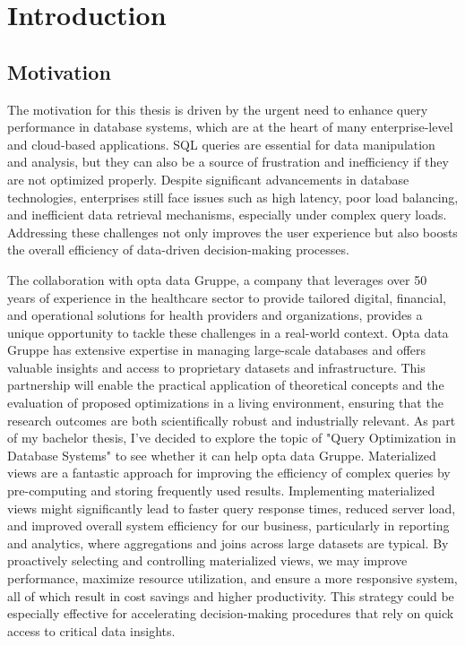 \section{Introduction}
\subsection{Motivation}
The motivation for this thesis is driven by the urgent need to enhance query performance in database systems, which are at the heart of many enterprise-level and cloud-based applications. SQL queries are essential for data manipulation and analysis, but they can also be a source of frustration and inefficiency if they are not optimized properly. Despite significant advancements in database technologies, enterprises still face issues such as high latency, poor load balancing, and inefficient data retrieval mechanisms, especially under complex query loads. Addressing these challenges not only improves the user experience but also boosts the overall efficiency of data-driven decision-making processes.\vspace{.4cm}

The collaboration with opta data Gruppe, a company that leverages over 50 years of experience in the healthcare sector to provide tailored digital, financial, and operational solutions for health providers and organizations, provides a unique opportunity to tackle these challenges in a real-world context. Opta data Gruppe has extensive expertise in managing large-scale databases and offers valuable insights and access to proprietary datasets and infrastructure. This partnership will enable the practical application of theoretical concepts and the evaluation of proposed optimizations in a living environment, ensuring that the research outcomes are both scientifically robust and industrially relevant. \vspace{.4cm}
As part of my bachelor thesis, I've decided to explore the topic of "Query Optimization in Database Systems" to see whether it can help opta data Gruppe. Materialized views are a fantastic approach for improving the efficiency of complex queries by pre-computing and storing frequently used results. Implementing materialized views might significantly lead to faster query response times, reduced server load, and improved overall system efficiency for our business, particularly in reporting and analytics, where aggregations and joins across large datasets are typical. By proactively selecting and controlling materialized views, we may improve performance, maximize resource utilization, and ensure a more responsive system, all of which result in cost savings and higher productivity. This strategy could be especially effective for accelerating decision-making procedures that rely on quick access to critical data insights.

